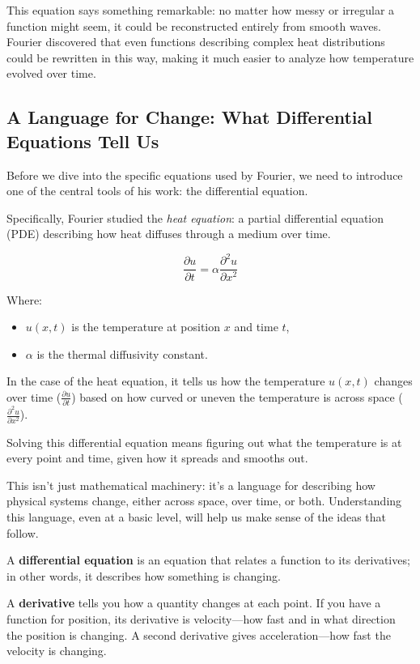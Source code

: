 This equation says something remarkable: no matter how messy or irregular a function might seem, it could be reconstructed entirely from smooth waves. Fourier discovered that even functions describing complex heat distributions could be rewritten in this way, making it much easier to analyze how temperature evolved over time.


\subsection*{A Language for Change: What Differential Equations Tell Us}

Before we dive into the specific equations used by Fourier, we need to introduce one of the central tools of his work: the differential equation. 


Specifically, Fourier studied the \textit{heat equation}: a partial differential equation (PDE) describing how heat diffuses through a medium over time.

\[
\frac{\partial u}{\partial t} = \alpha \frac{\partial^2 u}{\partial x^2}
\]


Where:
\begin{itemize}
  \item \( u(x, t) \) is the temperature at position \( x \) and time \( t \),
  \item \( \alpha \) is the thermal diffusivity constant.
\end{itemize}

In the case of the heat equation, it tells us how the temperature \( u(x, t) \) changes over time (\( \frac{\partial u}{\partial t} \)) based on how curved or uneven the temperature is across space (\( \frac{\partial^2 u}{\partial x^2} \)). 

Solving this differential equation means figuring out what the temperature is at every point and time, given how it spreads and smooths out.

This isn’t just mathematical machinery: it’s a language for describing how physical systems change, either across space, over time, or both. Understanding this language, even at a basic level, will help us make sense of the ideas that follow.

A \textbf{differential equation} is an equation that relates a function to its derivatives; in other words, it describes how something is changing.

A \textbf{derivative} tells you how a quantity changes at each point. If you have a function for position, its derivative is velocity—how fast and in what direction the position is changing. A second derivative gives acceleration—how fast the velocity is changing.

